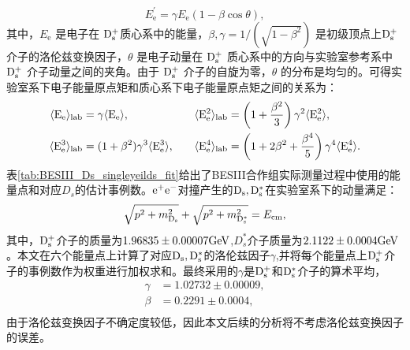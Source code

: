 \begin{equation}
E_{\mathrm{e}}^{\prime} = \gamma E_{\mathrm{e}}(1 - \beta \cos \theta),
\end{equation}
其中，$E_{\mathrm{e}}$ 是电子在 $\mathrm{D_s^+}$质心系中的能量，$\beta, \gamma = 1/(\sqrt{1 - \beta^2})$ 是初级顶点上$\mathrm{D_s^+}$ 介子的洛伦兹变换因子，$\theta$ 是电子动量在 $\mathrm{D_s^+}$ 质心系中的方向与实验室参考系中 $\mathrm{D_s^+}$ 介子动量之间的夹角。由于 $\mathrm{D_s^+}$ 介子的自旋为零，$\theta$ 的分布是均匀的。可得实验室系下电子能量原点矩和质心系下电子能量原点矩之间的关系为：
\begin{equation}\label{eq:boost}
    \begin{aligned}
     \langle \mathrm{E_e} \rangle_{\rm lab} &= \gamma \langle \rm E_e \rangle, & \quad \langle \rm E_e^2 \rangle_{\rm lab} &= \left( 1 + \frac{\beta^2}{3} \right) \gamma^2 \langle\rm E_e^2 \rangle, \\
     \langle \mathrm{E_e^3} \rangle_{\rm lab} &= (1 + \beta^2) \gamma^3 \langle \rm E_e^3 \rangle, & \quad \langle \rm E_e^4 \rangle_{\rm lab} &= \left( 1 + 2 \beta^2 + \frac{\beta^4}{5} \right) \gamma^4 \langle \rm E_e^4 \rangle.
    \end{aligned}
  \end{equation}
表\ref{tab:BESIII_Ds_singleyeilds_fit}给出了BESIII合作组实际测量过程中使用的能量点和对应$D_{s}$的估计事例数。$\mathrm{e^+ e^-}$对撞产生的$\mathrm{D_{s},D^{*}_s}$在实验室系下的动量满足：
\begin{equation}
    \sqrt{p^2 + m_{\mathrm{D_s}}^2} + \sqrt{p^2 + m_{\mathrm{D_s^{*}}}^2} = E_{\mathrm{cm}},
\end{equation}
其中，$\mathrm{D_s^+}$介子的质量为$1.96835\pm 0.00007\mathrm{GeV}$,$D^*_s$介子质量为$2.1122\pm0.0004\mathrm{GeV}$。本文在六个能量点上计算了对应$\mathrm{D_s,D^*_s}$的洛伦兹因子$\gamma$,并将每个能量点上$\mathrm{D_s^+}$介子的事例数作为权重进行加权求和。最终采用的$\gamma$是$\mathrm{D_s^+}$和$\mathrm{D_s^*}$介子的算术平均，
\begin{equation}
    \begin{aligned}
        \gamma&=1.02732 \pm 0.00009,\\
        \beta&= 0.2291 \pm 0.0004,\\
    \end{aligned}
    \end{equation}
由于洛伦兹变换因子不确定度较低，因此本文后续的分析将不考虑洛伦兹变换因子的误差。

